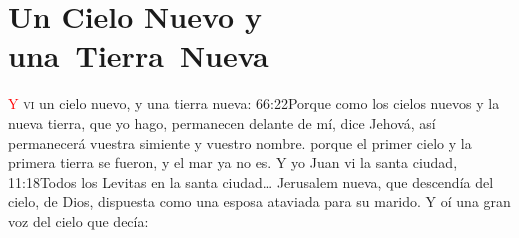 
\chapter{Un Cielo Nuevo y \mbox{una Tierra Nueva}}
\lettrine[lines=3,slope=-0.5em,loversize=0.1]{\textcolor{red}{Y}}{\hspace{0.5em} vi} un cielo nuevo, y una tierra nueva:%
				{66:22}{Porque como los cielos nuevos y la nueva tierra, que yo hago, permanecen delante de mí, dice Jehová, así permanecerá vuestra simiente y vuestro nombre.} %
 porque el primer cielo y la primera tierra se fueron, y el mar ya no es. 
Y yo Juan vi la santa ciudad,%
					{11:18}{Todos los Levitas en la santa ciudad\ldots} %
 Jerusalem nueva, que descendía del cielo, de Dios, dispuesta como una esposa ataviada para su marido.%
Y oí una gran voz del cielo que decía:
